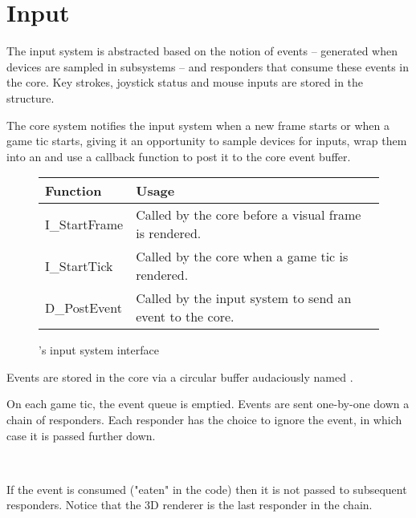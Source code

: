 \section{Input}
The input system is abstracted based on the notion of events -- generated when devices are sampled in subsystems -- and responders that consume these events in the core. Key strokes, joystick status and mouse inputs are stored in the  structure.\\
\par
{}
\par
The core system notifies the input system when a new frame starts or when a game tic starts, giving it an opportunity to sample devices for inputs, wrap them into an  and use a callback function to post it to the core event buffer.\\
\par
\begin{figure}[H]
\centering  
\begin{tabularx}{\textwidth}{ L{0.6}  L{1.4}}
  \toprule
  \textbf{Function} &  \textbf{Usage}\\
  \toprule 
  I\_StartFrame & Called by the core before a visual frame is rendered.\\
  I\_StartTick & Called by the core when a game tic is rendered.\\
  
  D\_PostEvent & Called by the input system to send an event to the core.\\
   \toprule
\end{tabularx}
\caption{\doom{}'s input system interface}
\end{figure}
\par
Events are stored in the core via a circular buffer audaciously named .\\
\par
{}

\par
On each game tic, the event queue is emptied. Events are sent one-by-one down a chain of responders. Each responder has the choice to ignore the event, in which case it is passed further down.\\
\par
{}\\
 \par If the event is consumed ("eaten" in the code) then it is not passed to subsequent responders. Notice that the 3D renderer is the last responder in the chain.\\
 

